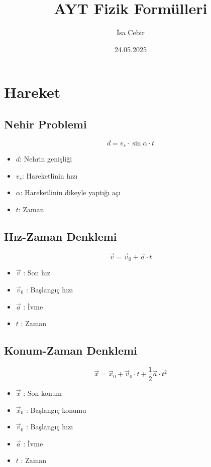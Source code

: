 \documentclass[a4paper, 11pt, titlepage]{article}
\title{AYT Fizik Formülleri}
\author{İsa Cebir}
\date{24.05.2025}
\begin{document}
\pagestyle{fancy}
\maketitle
\thispagestyle{empty}
\fancyhf{} 
\fancyfoot[R]{\thepage}
\renewcommand{\headrulewidth}{0.2pt}
\renewcommand{\footrulewidth}{0.2pt}

\twocolumn

\tableofcontents
\newpage
\twocolumn

\section{Hareket}
\subsection{Nehir Problemi}
\[
d = v_s \cdot \sin \alpha \cdot t
\]
\begin{itemize}
  \item $d$: Nehrin genişliği
  \item $v_s$: Hareketlinin hızı
  \item $\alpha$: Hareketlinin dikeyle yaptığı açı
  \item $t$: Zaman
\end{itemize}

\subsection{Hız-Zaman Denklemi}
\[
\vec{v} = \vec{v}_0 + \vec{a} \cdot t
\]
\begin{itemize}
  \item $\vec{v}$ : Son hız
  \item $\vec{v}_0$ : Başlangıç hızı
  \item $\vec{a}$ : İvme
  \item $t$ : Zaman
\end{itemize}

\subsection{Konum-Zaman Denklemi}
\[
\vec{x} = \vec{x}_0 + \vec{v}_0 \cdot t + \frac{1}{2} \vec{a} \cdot t^2
\]
\begin{itemize}
  \item $\vec{x}$ : Son konum
  \item $\vec{x}_0$ : Başlangıç konumu
  \item $\vec{v}_0$ : Başlangıç hızı
  \item $\vec{a}$ : İvme
  \item $t$ : Zaman
\end{itemize}
\end{document}
